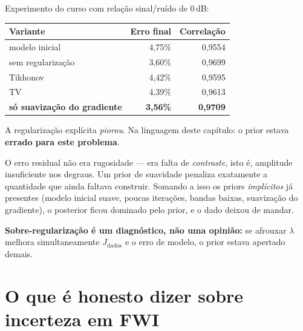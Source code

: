 \documentclass[11pt,a4paper,oneside]{report}
\begin{document}
Experimento do curso com rela\c{c}\~ao sinal/ru\'ido de 0\,dB:

\begin{center}
\begin{tabular}{@{}lrr@{}}
\toprule
\textbf{Variante} & \textbf{Erro final} & \textbf{Correla\c{c}\~ao} \\
\midrule
modelo inicial & 4{,}75\% & 0{,}9554 \\
sem regulariza\c{c}\~ao & 3{,}60\% & 0{,}9699 \\
Tikhonov & 4{,}42\% & 0{,}9595 \\
TV & 4{,}39\% & 0{,}9613 \\
\textbf{s\'o suaviza\c{c}\~ao do gradiente} & \textbf{3{,}56\%} & \textbf{0{,}9709} \\
\bottomrule
\end{tabular}
\end{center}

\begin{teoria}
A regulariza\c{c}\~ao expl\'icita \emph{piorou}. Na linguagem deste
cap\'itulo: o prior estava \textbf{errado para este problema}.

O erro residual n\~ao era rugosidade --- era falta de \emph{contraste}, isto
\'e, amplitude insuficiente nos degraus. Um prior de suavidade penaliza
exatamente a quantidade que ainda faltava construir. Somando a isso os priors
\emph{impl\'icitos} j\'a presentes (modelo inicial suave, poucas
itera\c{c}\~oes, bandas baixas, suaviza\c{c}\~ao do gradiente), o posterior
ficou dominado pelo prior, e o dado deixou de mandar.

\textbf{Sobre-regulariza\c{c}\~ao \'e um diagn\'ostico, n\~ao uma
opini\~ao:} se afrouxar $\lambda$ melhora simultaneamente $J_{\text{dados}}$ e
o erro de modelo, o prior estava apertado demais.
\end{teoria}

\section{O que \'e honesto dizer sobre incerteza em FWI}
\end{document}
